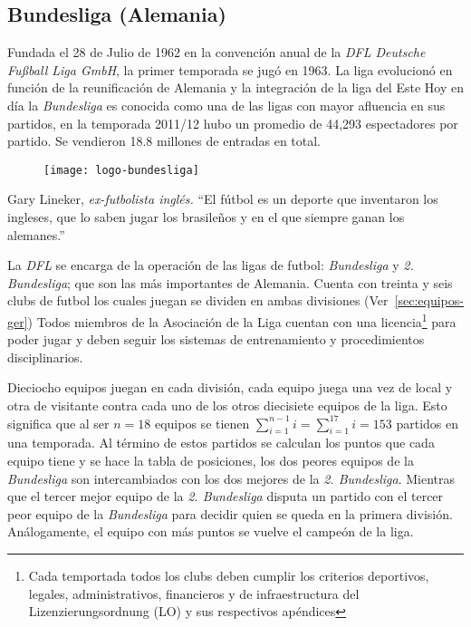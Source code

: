 \subsection{Bundesliga (Alemania)}


Fundada el 28 de Julio de 1962 en la convención anual de la \emph{DFL Deutsche Fußball Liga GmbH}, la primer temporada se jugó en 1963. La liga evolucionó en función de la reunificación de Alemania y la integración de la liga del Este \cite{hesse2003tor} Hoy en día la \emph{Bundesliga} es conocida como una de las ligas con mayor afluencia en sus partidos, en la temporada 2011/12 hubo un promedio de 44,293 espectadores por partido. Se vendieron 18.8 millones de entradas en total.

\begin{figure}[!htb]\centering
   \begin {minipage}{0.4\textwidth}
     \texttt{[image: logo-bundesliga]}
   \end{minipage}
\end{figure}
\begin{chapquote}{Gary Lineker, \textit{ex-futbolista inglés.}}
	``El fútbol es un deporte que inventaron los ingleses, que lo saben jugar los brasileños y en el que siempre ganan los alemanes.''
\end{chapquote}


La \emph{DFL} se encarga de la operación de las ligas de futbol: \emph{Bundesliga} y \emph{2. Bundesliga}; que son las más importantes de Alemania. Cuenta con treinta y seis clubs de futbol los cuales juegan se dividen en ambas divisiones (Ver~\cref{sec:equipos-ger}) Todos miembros de la Asociación  de la Liga cuentan con una licencia\footnote{Cada temportada todos los clubs deben cumplir los criterios deportivos, legales, administrativos, financieros y de infraestructura del Lizenzierungsordnung (LO) y sus respectivos apéndices} para poder jugar y deben seguir los sistemas de entrenamiento y procedimientos disciplinarios.

Dieciocho equipos juegan en cada división, cada equipo juega una vez de local y otra de visitante contra cada uno de los otros diecisiete equipos de la liga. Esto significa que al ser $n=18$ equipos se tienen $\sum\limits_{i=1}^{n-1} i= \sum\limits_{i=1}^{17} i= 153 $ partidos en una temporada. Al término de estos partidos se calculan los puntos que cada equipo tiene y se hace la tabla de posiciones, los dos peores equipos de la \emph{Bundesliga} son intercambiados con los dos mejores de la \emph{2. Bundesliga}. Mientras que el tercer mejor equipo de la \emph{2. Bundesliga} disputa un partido con el tercer peor equipo de la \emph{Bundesliga} para decidir quien se queda en la primera división. Análogamente, el equipo con más puntos se vuelve el campeón de la liga.

